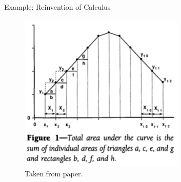\begin{frame}{Example: Reinvention of Calculus}
  \begin{figure}
    \centering
    \includegraphics[width=0.7\textwidth]{Figures/calculus.png}
    \vspace{-0.25cm}
    \caption{Taken from paper. \cite{Tai1994}}
  \end{figure}
\end{frame}
